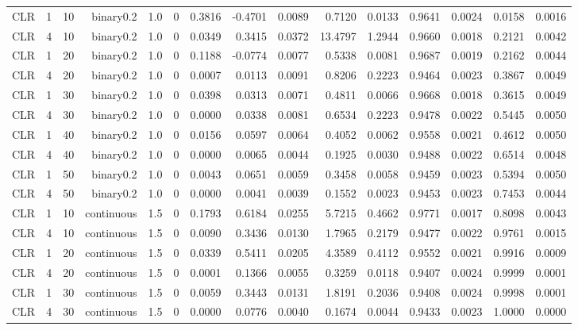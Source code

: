 \begin{longtable}{rrrrrrrrrrrrrrr}
  CLR & 1 & 10 & binary0.2 & 1.0 & 0 & 0.3816 & -0.4701 & 0.0089 & 0.7120 & 0.0133 & 0.9641 & 0.0024 & 0.0158 & 0.0016 \\ 
  CLR & 4 & 10 & binary0.2 & 1.0 & 0 & 0.0349 & 0.3415 & 0.0372 & 13.4797 & 1.2944 & 0.9660 & 0.0018 & 0.2121 & 0.0042 \\ 
  CLR & 1 & 20 & binary0.2 & 1.0 & 0 & 0.1188 & -0.0774 & 0.0077 & 0.5338 & 0.0081 & 0.9687 & 0.0019 & 0.2162 & 0.0044 \\ 
  CLR & 4 & 20 & binary0.2 & 1.0 & 0 & 0.0007 & 0.0113 & 0.0091 & 0.8206 & 0.2223 & 0.9464 & 0.0023 & 0.3867 & 0.0049 \\ 
  CLR & 1 & 30 & binary0.2 & 1.0 & 0 & 0.0398 & 0.0313 & 0.0071 & 0.4811 & 0.0066 & 0.9668 & 0.0018 & 0.3615 & 0.0049 \\ 
  CLR & 4 & 30 & binary0.2 & 1.0 & 0 & 0.0000 & 0.0338 & 0.0081 & 0.6534 & 0.2223 & 0.9478 & 0.0022 & 0.5445 & 0.0050 \\ 
  CLR & 1 & 40 & binary0.2 & 1.0 & 0 & 0.0156 & 0.0597 & 0.0064 & 0.4052 & 0.0062 & 0.9558 & 0.0021 & 0.4612 & 0.0050 \\ 
  CLR & 4 & 40 & binary0.2 & 1.0 & 0 & 0.0000 & 0.0065 & 0.0044 & 0.1925 & 0.0030 & 0.9488 & 0.0022 & 0.6514 & 0.0048 \\ 
  CLR & 1 & 50 & binary0.2 & 1.0 & 0 & 0.0043 & 0.0651 & 0.0059 & 0.3458 & 0.0058 & 0.9459 & 0.0023 & 0.5394 & 0.0050 \\ 
  CLR & 4 & 50 & binary0.2 & 1.0 & 0 & 0.0000 & 0.0041 & 0.0039 & 0.1552 & 0.0023 & 0.9453 & 0.0023 & 0.7453 & 0.0044 \\ 
  CLR & 1 & 10 & continuous & 1.5 & 0 & 0.1793 & 0.6184 & 0.0255 & 5.7215 & 0.4662 & 0.9771 & 0.0017 & 0.8098 & 0.0043 \\ 
  CLR & 4 & 10 & continuous & 1.5 & 0 & 0.0090 & 0.3436 & 0.0130 & 1.7965 & 0.2179 & 0.9477 & 0.0022 & 0.9761 & 0.0015 \\ 
  CLR & 1 & 20 & continuous & 1.5 & 0 & 0.0339 & 0.5411 & 0.0205 & 4.3589 & 0.4112 & 0.9552 & 0.0021 & 0.9916 & 0.0009 \\ 
  CLR & 4 & 20 & continuous & 1.5 & 0 & 0.0001 & 0.1366 & 0.0055 & 0.3259 & 0.0118 & 0.9407 & 0.0024 & 0.9999 & 0.0001 \\ 
  CLR & 1 & 30 & continuous & 1.5 & 0 & 0.0059 & 0.3443 & 0.0131 & 1.8191 & 0.2036 & 0.9408 & 0.0024 & 0.9998 & 0.0001 \\ 
  CLR & 4 & 30 & continuous & 1.5 & 0 & 0.0000 & 0.0776 & 0.0040 & 0.1674 & 0.0044 & 0.9433 & 0.0023 & 1.0000 & 0.0000 \\ 

\end{longtable}
